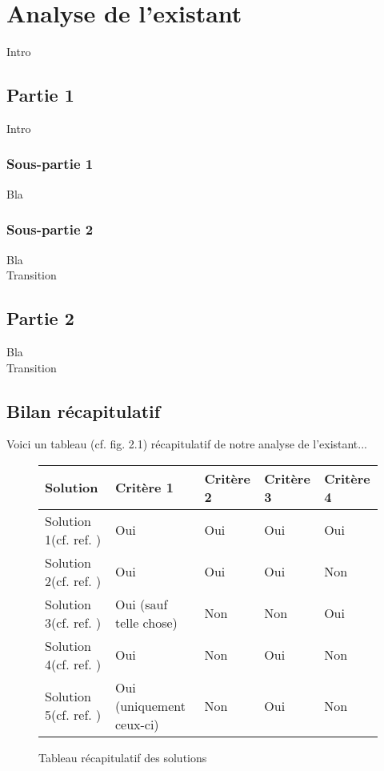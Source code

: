 \chapter{Analyse de l'existant}

Intro

\section{Partie 1}

Intro

\subsection{Sous-partie 1}

Bla

\subsection{Sous-partie 2}

Bla\\

Transition

\section{Partie 2}

Bla\\

Transition

\section{Bilan récapitulatif}

Voici un tableau (cf. fig. 2.1) récapitulatif de notre analyse de l'existant...\\

\begin{figure}[!h]
\begin{center}
\begin{tabular}{|l|l|l|l|l|}
  \hline
  Solution & Critère 1 & Critère 2 & Critère 3 & Critère 4\\
  \hline
  Solution 1(cf. ref. \cite{cite0}) & Oui & Oui & Oui & Oui \\
  Solution 2(cf. ref. \cite{cite1}) & Oui & Oui & Oui & Non \\
  Solution 3(cf. ref. \cite{cite2}) & Oui (sauf telle chose) & Non & Non & Oui\\
  Solution 4(cf. ref. \cite{cite3}) & Oui& Non & Oui & Non\\
  Solution 5(cf. ref. \cite{cite4}) & Oui (uniquement ceux-ci) & Non & Oui & Non\\
  \hline
\end{tabular}
\end{center}
\caption{Tableau récapitulatif des solutions}
\end{figure}
